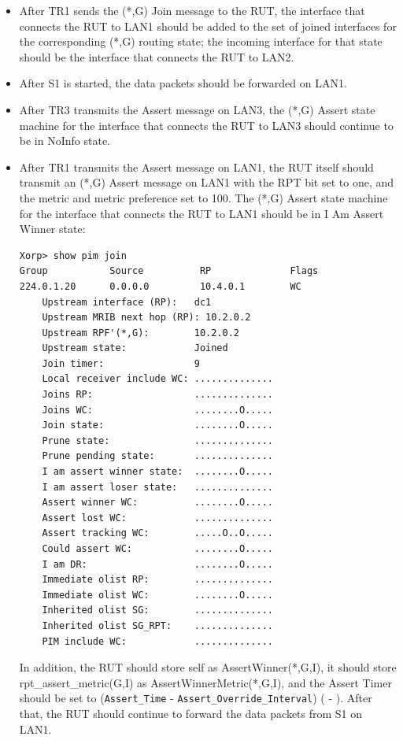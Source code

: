 \documentclass[11pt]{report}
\begin{document}

\begin{itemize}

  \item After TR1 sends the (*,G) Join message to the RUT, the interface that
  connects the RUT to LAN1 should be added to the set of joined interfaces for
  the corresponding (*,G) routing state; the incoming interface for that state
  should be the interface that connects the RUT to LAN2.

  \item After S1 is started, the data packets should be forwarded on LAN1.

  \item After TR3 transmits the Assert message on LAN3, the (*,G) Assert state
  machine for the interface that connects the RUT to LAN3 should continue to
  be in NoInfo state.

  \item After TR1 transmits the Assert message on LAN1, the RUT itself should
  transmit an (*,G) Assert message on LAN1 with the RPT bit set to one,
  and the metric and metric preference set to 100. The (*,G) Assert state
  machine for the interface that connects the RUT to LAN1 should be in I Am
  Assert Winner state:

\begin{verbatim}
Xorp> show pim join 
Group           Source          RP              Flags
224.0.1.20      0.0.0.0         10.4.0.1        WC   
    Upstream interface (RP):   dc1
    Upstream MRIB next hop (RP): 10.2.0.2
    Upstream RPF'(*,G):        10.2.0.2
    Upstream state:            Joined 
    Join timer:                9
    Local receiver include WC: ..............
    Joins RP:                  ..............
    Joins WC:                  ........O.....
    Join state:                ........O.....
    Prune state:               ..............
    Prune pending state:       ..............
    I am assert winner state:  ........O.....
    I am assert loser state:   ..............
    Assert winner WC:          ........O.....
    Assert lost WC:            ..............
    Assert tracking WC:        .....O..O.....
    Could assert WC:           ........O.....
    I am DR:                   ........O.....
    Immediate olist RP:        ..............
    Immediate olist WC:        ........O.....
    Inherited olist SG:        ..............
    Inherited olist SG_RPT:    ..............
    PIM include WC:            ..............
\end{verbatim}

  In addition, the RUT should store self as AssertWinner(*,G,I), it should
  store rpt\_assert\_metric(G,I) as AssertWinnerMetric(*,G,I), and the
  Assert Timer should be set to \newline
  (\verb=Assert_Time= - \verb=Assert_Override_Interval=)
  ({\PimsmAssertTime} - {\PimsmAssertOverrideInterval}).
  After that, the RUT should continue to forward the data packets from S1 on
  LAN1.

\end{itemize}
\end{document}
